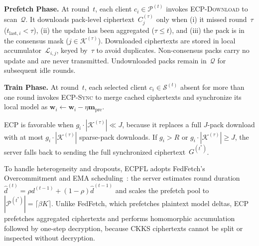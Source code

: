 \documentclass[10pt,conference]{IEEEtran}
\begin{document}
\textbf{Prefetch Phase.}
At round~$t$, each client $c_i \in \mathcal{P}^{(t)}$ invokes \textsc{ECP-Download} to scan~$\mathcal{Q}$.
It downloads pack-level ciphertext~$C_j^{(\tau)}$ only when (i) it missed round~$\tau$ ($t_{\mathrm{last},i}<\tau$), (ii) the update has been aggregated ($\tau\le t$), and (iii) the pack is in the consensus mask ($j\in\mathcal{K}^{(\tau)}$).
Downloaded ciphertexts are stored in local accumulator~$\mathcal{L}_{i,j}$, keyed by~$\tau$ to avoid duplicates.
Non-consensus packs carry no update and are never transmitted.
Undownloaded packs remain in~$\mathcal{Q}$ for subsequent idle rounds.

\textbf{Train Phase.}
At round~$t$, each selected client $c_i \in \mathcal{S}^{(t)}$ absent for more than one round invokes \textsc{ECP-Sync} to merge cached ciphertexts and synchronize its local model as $\mathbf{w}_i\leftarrow\mathbf{w}_i-\eta\mathbf{m}_{\mathrm{pre}}$.

ECP is favorable when $g_i\cdot|\mathcal{K}^{(\tau)}|\ll J$, because it replaces a full $J$-pack download with at most $g_i\cdot|\mathcal{K}^{(\tau)}|$ sparse-pack downloads.
If $g_i>R$ or $g_i\cdot|\mathcal{K}^{(\tau)}|\ge J$, the server falls back to sending the full synchronized ciphertext~$G^{(t^*)}$.

To handle heterogeneity and dropouts, \textsc{ECPFL} adopts FedFetch's Overcommitment and EMA scheduling~\cite{yan2025fedfetch}: the server estimates round duration $\hat{d}^{(t)}=\rho d^{(t-1)}+(1-\rho)\hat{d}^{(t-1)}$ and scales the prefetch pool to $|\mathcal{P}^{(t^*)}|=\lceil\beta K\rceil$.
Unlike FedFetch, which prefetches plaintext model deltas, ECP prefetches aggregated ciphertexts and performs homomorphic accumulation followed by one-step decryption, because CKKS ciphertexts cannot be split or inspected without decryption.
\end{document}
